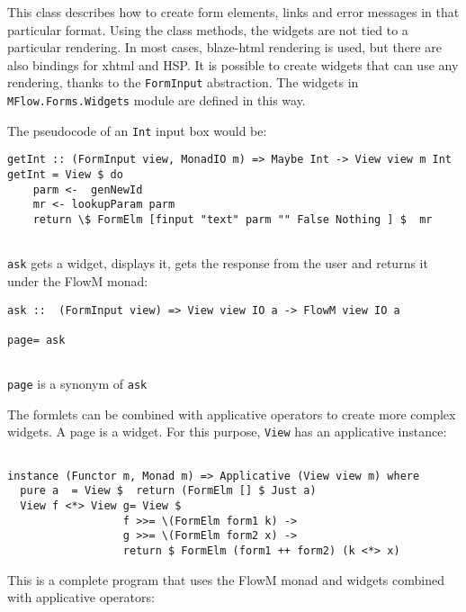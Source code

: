 \documentclass{tmr}
\begin{document}
This class describes how to create form elements, links and error 
messages in that particular format. Using the class methods, the 
widgets are not tied to a particular rendering. In most cases, blaze-html rendering is used, but there are also bindings for xhtml and HSP\@. It is possible to create widgets that can use any rendering, thanks to the {\tt FormInput} abstraction. The widgets in {\tt MFlow.Forms.Widgets} module are defined in this way. 
 
The pseudocode of an {\tt Int} input box would be: 
 
{\tt 
 
\begin{verbatim} 
getInt :: (FormInput view, MonadIO m) => Maybe Int -> View view m Int 
getInt = View $ do 
    parm <-  genNewId 
    mr <- lookupParam parm 
    return \$ FormElm [finput "text" parm "" False Nothing ] $  mr 
 
\end{verbatim} 
 
} 
 
{\tt ask} gets a  widget, displays it, gets the response from the user and returns it under the FlowM monad: 
 
{\tt 
 
\begin{verbatim} 
ask ::  (FormInput view) => View view IO a -> FlowM view IO a 
 
page= ask 
 
\end{verbatim} 
 
} 
{\tt page} is a synonym of {\tt ask} 
 
The formlets can be combined with applicative operators to create more complex widgets. A page is a widget. For this purpose, {\tt View} has an applicative instance: 
 
{\tt 
 
\begin{verbatim} 
 
instance (Functor m, Monad m) => Applicative (View view m) where 
  pure a  = View $  return (FormElm [] $ Just a) 
  View f <*> View g= View $ 
                  f >>= \(FormElm form1 k) -> 
                  g >>= \(FormElm form2 x) -> 
                  return $ FormElm (form1 ++ form2) (k <*> x)
\end{verbatim} 
 
} 
 
This is a complete program that uses the FlowM monad and widgets 
combined with applicative operators: 
 
\end{document}
